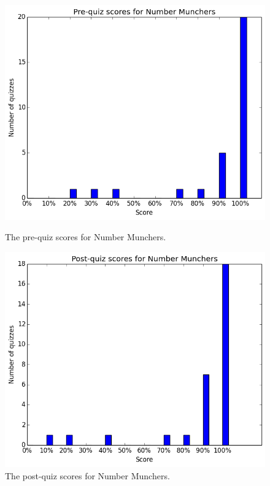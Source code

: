 			\begin{figure}[h] 
			\centering 
			\begin{minipage}[b]{0.45\linewidth}
			\includegraphics[height=0.33\textheight]{munchers_pre.png} 
			\caption{The pre-quiz scores for Number Munchers.}
			\end{minipage}
			\quad
			\begin{minipage}[b]{0.45\linewidth}
			\includegraphics[height=0.33\textheight]{munchers_post.png} 
			\caption{The post-quiz scores for Number Munchers.}
			\end{minipage}
			\end{figure}

